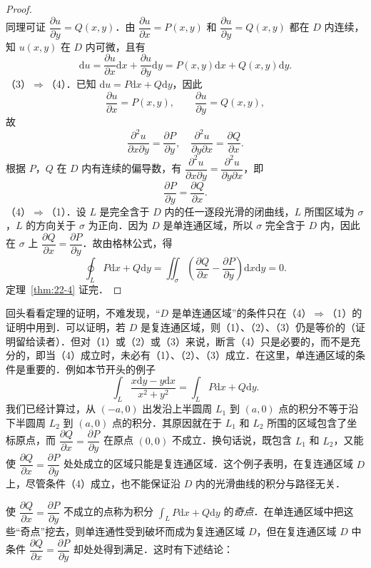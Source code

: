 \begin{proof}
\[\]
同理可证 $\dfrac{\partial u}{\partial y}=Q(x,y)$．由 $\dfrac{\partial u}{\partial x}=P(x,y)$ 和 $\dfrac{\partial u}{\partial y}=Q(x,y)$ 都在 $D$ 内连续，知 $u(x,y)$ 在 $D$ 内可微，且有
\[
\mathrm{d}u=\frac{\partial u}{\partial x}\mathrm{d}x+\frac{\partial u}{\partial y}\mathrm{d}y=P(x,y)\mathrm{d}x+Q(x,y)\mathrm{d}y.
\]
（3）$\Rightarrow$（4）．已知 $\mathrm{d}u=P\mathrm{d}x+Q\mathrm{d}y$，因此
\[
\frac{\partial u}{\partial x}=P(x,y),\qquad\frac{\partial u}{\partial y}=Q(x,y),
\]
故
\[
\frac{\partial^{2}u}{\partial x\partial y}=\frac{\partial P}{\partial y},\quad\frac{\partial^{2}u}{\partial y\partial x}=\frac{\partial Q}{\partial x}.
\]
根据 $P$，$Q$ 在 $D$ 内有连续的偏导数，有 $\dfrac{\partial^{2}u}{\partial x\partial y}=\dfrac{\partial^{2}u}{\partial y\partial x}$，即
\[
\frac{\partial P}{\partial y}=\frac{\partial Q}{\partial x}.
\]
（4）$\Rightarrow$（1）．设 $L$ 是完全含于 $D$ 内的任一逐段光滑的闭曲线，$L$ 所围区域为 $\sigma$，$L$ 的方向关于 $\sigma$ 为正向．因为 $D$ 是单连通区域，所以 $\sigma$ 完全含于 $D$ 内，因此在 $\sigma$ 上 $\dfrac{\partial Q}{\partial x}=\dfrac{\partial P}{\partial y}$．故由格林公式，得
\[
\oint_{L}P\mathrm{d}x+Q\mathrm{d}y=\iint_{\sigma}\left(\frac{\partial Q}{\partial x}-\frac{\partial P}{\partial y}\right)\mathrm{d}x\mathrm{d}y=0.
\]
定理~\ref{thm:22-4} 证完．
\end{proof}

回头看看定理的证明，不难发现，``$D$ 是单连通区域''的条件只在（4）$\Rightarrow$（1）的证明中用到．可以证明，若 $D$ 是复连通区域，则（1）、（2）、（3）仍是等价的（证明留给读者）．但对（1）或（2）或（3）来说，断言（4）只是必要的，而不是充分的，即当（4）成立时，未必有（1）、（2）、（3）成立．在这里，单连通区域的条件是重要的．例如本节开头的例子
\[
\int_{L}\frac{x\mathrm{d}y-y\mathrm{d}x}{x^{2}+y^{2}}=\int_{L}P\mathrm{d}x+Q\mathrm{d}y.
\]
我们已经计算过，从 $(-a,0)$ 出发沿上半圆周 $L_{1}$ 到 $(a,0)$ 点的积分不等于沿下半圆周 $L_{2}$ 到 $(a,0)$ 点的积分．其原因就在于 $L_{1}$ 和 $L_{2}$ 所围的区域包含了坐标原点，而 $\dfrac{\partial Q}{\partial x}=\dfrac{\partial P}{\partial y}$ 在原点 $(0,0)$ 不成立．换句话说，既包含 $L_{1}$ 和 $L_{2}$，又能使 $\dfrac{\partial Q}{\partial x}=\dfrac{\partial P}{\partial y}$ 处处成立的区域只能是复连通区域．这个例子表明，在复连通区域 $D$ 上，尽管条件（4）成立，也不能保证沿 $D$ 内的光滑曲线的积分与路径无关．

使 $\dfrac{\partial Q}{\partial x}=\dfrac{\partial P}{\partial y}$ 不成立的点称为积分 $\displaystyle\int_{L}P\mathrm{d}x+Q\mathrm{d}y$ 的\emph{奇点}．在单连通区域中把这些``奇点''挖去，则单连通性受到破坏而成为复连通区域 $D$，但在复连通区域 $D$ 中条件 $\dfrac{\partial Q}{\partial x}=\dfrac{\partial P}{\partial y}$ 却处处得到满足．这时有下述结论：

